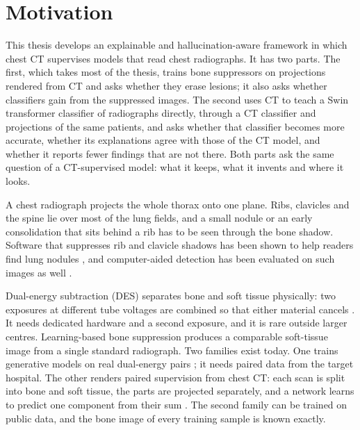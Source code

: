 \section{Motivation}
This thesis develops an explainable and hallucination-aware framework in which chest CT supervises models that read chest radiographs. It
has two parts. The first, which takes most of the thesis, trains bone suppressors on projections rendered from CT and asks whether they
erase lesions; it also asks whether classifiers gain from the suppressed images. The second uses CT to teach a Swin transformer classifier
of radiographs directly, through a CT classifier and projections of the same patients, and asks whether that classifier becomes more
accurate, whether its explanations agree with those of the CT model, and whether it reports fewer findings that are not there. Both parts
ask the same question of a CT-supervised model: what it keeps, what it invents and where it looks.

A chest radiograph projects the whole thorax onto one plane. Ribs, clavicles and the spine lie over most of the lung fields, and a small nodule
or an early consolidation that sits behind a rib has to be seen through the bone shadow. Software that suppresses rib and clavicle shadows has
been shown to help readers find lung nodules \citep{freedman2011lung}, and computer-aided detection has been evaluated on such images as well
\citep{schalekamp2014cad}.

Dual-energy subtraction (DES) separates bone and soft tissue physically: two exposures at different tube voltages are combined so that either
material cancels \citep{kuhlman2006des}. It needs dedicated hardware and a second exposure, and it is rare outside larger centres. Learning-based
bone suppression produces a comparable soft-tissue image from a single standard radiograph. Two families exist today. One trains generative
models on real dual-energy pairs \citep{chen2024bsdiff,sun2026bsldm,sun2025gllcm,sun2026debonedit}; it needs paired data from the target
hospital. The other renders paired supervision from chest CT: each scan is split into bone and soft tissue, the parts are projected separately,
and a network learns to predict one component from their sum \citep{angaitkar2026anatomy}. The second family can be trained on public data,
and the bone image of every training sample is known exactly.


